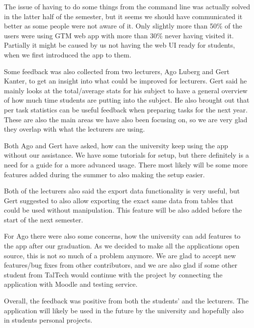 The issue of having to do some things from the command line was actually solved in the latter half of the semester, but it seems
we should have communicated it better as some people were not aware of it.
Only slightly more than 50\% of the users were using GTM web app with more than 30\% never having visited it.
Partially it might be caused by us not having the web UI ready for students, when we first introduced the app to them.

Some feedback was also collected from two lecturers, Ago Luberg and Gert Kanter, to get an insight into what could be improved for lecturers.
Gert said he mainly looks at the total/average stats for his subject to have a general overview of how much time students are
putting into the subject.
He also brought out that per task statistics can be useful feedback when preparing tasks for the next year.
These are also the main areas we have also been focusing on, so we are very glad they overlap with what the lecturers are using.

Both Ago and Gert have asked, how can the university keep using the app without our assistance.
We have some tutorials for setup, but there definitely is a need for a guide for a more advanced usage.
There most likely will be some more features added during the summer to also making the setup easier.

Both of the lecturers also said the export data functionality is very useful, but Gert suggested to also allow
exporting the exact same data from tables that could be used without manipulation.
This feature will be also added before the start of the next semester.

For Ago there were also some concerns, how the university can add features to the app after our graduation.
As we decided to make all the applications open source, this is not so much of a problem anymore.
We are glad to accept new features/bug fixes from other contributors, and we are also glad if some other student from TalTech
would continue with the project by connecting the application with Moodle and testing service.

Overall, the feedback was positive from both the students' and the lecturers.
The application will likely be used in the future by the university and hopefully also in students personal projects.
